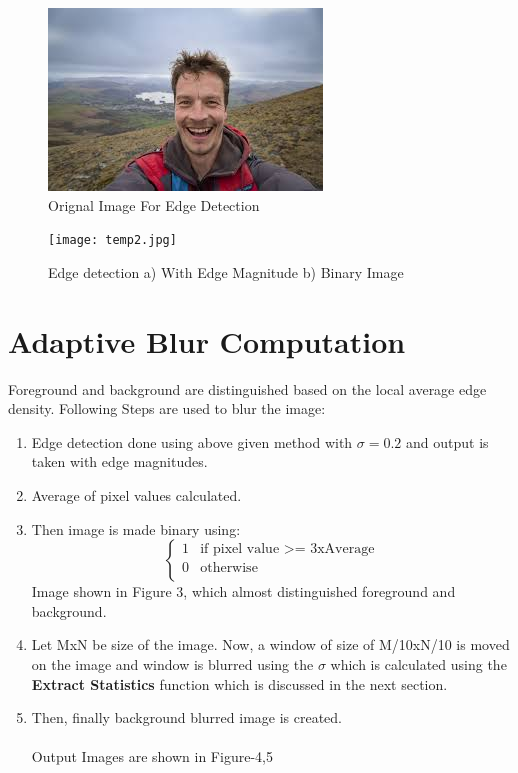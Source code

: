 \documentclass[extendedabs]{bmvc2k}
\begin{document}
\begin{figure}[t]
\includegraphics[width=\linewidth]{temp1.jpg}
\caption{
Orignal Image For Edge Detection}
\vspace{-2mm}
\end{figure}


\begin{figure}[t]
\texttt{[image: temp2.jpg]}
\caption{
Edge detection a) With Edge Magnitude b) Binary Image}
\vspace{-2mm}
\end{figure}

\section{Adaptive Blur Computation}
Foreground and background are distinguished based on the local average edge density.
Following Steps are used to blur the image:
\begin{enumerate}
    \item Edge detection done using above given method with $\sigma=0.2$ and output is taken with edge magnitudes.
    \item Average of pixel values calculated.
    \item Then image is made binary using:
    \[
    \begin{cases}
    1&\text{if pixel value >= 3xAverage}\\
    0&\text{otherwise}\\
    \end{cases}
    \]
    Image shown in Figure 3, which almost distinguished foreground and background.
    \item Let MxN be size of the image. Now, a window of size of M/10xN/10 is moved on the image and window is blurred using the $\sigma$ which is calculated using the \textbf{Extract Statistics} function which is discussed in the next section.
    \item Then, finally background blurred image is created.\\
    \\Output Images are shown in Figure-4,5
\end{enumerate}
\end{document}

